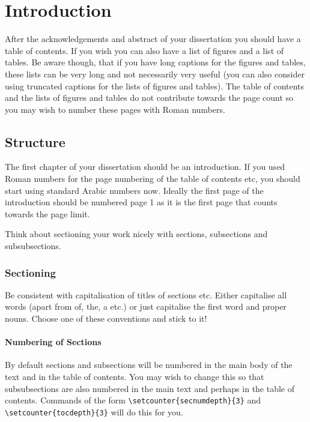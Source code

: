 \chapter{Introduction}

After the acknowledgements and abstract of your dissertation you should have a table of contents. If you wish you can also have a list of figures and a list of tables. Be aware though, that if you have long captions for the figures and tables, these lists can be very long and not necessarily very useful (you can also consider using truncated captions for the lists of figures and tables). The table of contents and the lists of figures and tables do not contribute towards the page count so you may wish to number these pages with Roman numbers. 

\section{Structure}

The first chapter of your dissertation should be an introduction. If you used Roman numbers for the page numbering of the table of contents etc, you should start using  standard Arabic numbers now. Ideally the first page of the introduction should be numbered page 1 as it is the first page that counts towards the page limit.

Think about sectioning your work nicely with sections, subsections and subsubsections.

\subsection{Sectioning}

Be consistent with capitalisation of titles of sections etc. Either capitalise all words (apart from of, the, a etc.) or just capitalise the first word and proper nouns. Choose one of these conventions and stick to it!

\subsubsection{Numbering of Sections}

By default sections and subsections will be numbered in the main body of the text and in the table of contents. You may wish to change this so that subsubsections are also numbered in the main text and perhaps in the table of contents. Commands of the form \verb|\setcounter{secnumdepth}{3}| and \verb|\setcounter{tocdepth}{3}| will do this for you.

